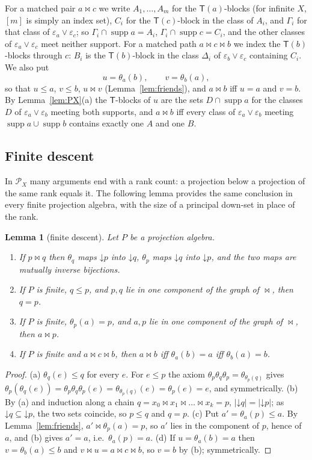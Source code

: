 \documentclass[11pt]{amsart}
\newtheorem{lemma}[theorem]{Lemma}
\theoremstyle{definition}
\renewcommand{\P}{\mathcal{P}}      %
\newcommand{\supp}{\operatorname{supp}}
\newcommand{\T}{\mathsf{T}}
\newcommand{\mt}{\bowtie}      %
\newcommand{\dn}{\mathord\downarrow}
\begin{document}
For a matched pair $a\mt c$ we write $A_1,\dots,A_m$ for the $\T(a)$-blocks (for infinite $X$, $[m]$ is simply an index set), $C_i$ for the $\T(c)$-block in the class of $A_i$, and $\Gamma_i$ for that class of $\varepsilon_a\vee\varepsilon_c$; so $\Gamma_i\cap\supp a=A_i$, $\Gamma_i\cap\supp c=C_i$, and the other classes of $\varepsilon_a\vee\varepsilon_c$ meet neither support. For a matched path $a\mt c\mt b$ we index the $\T(b)$-blocks through $c$: $B_i$ is the $\T(b)$-block in the class $\Delta_i$ of $\varepsilon_b\vee\varepsilon_c$ containing $C_i$. We also put
\[
u=\theta_a(b),\qquad v=\theta_b(a),
\]
so that $u\le a$, $v\le b$, $u\mt v$ (Lemma~\ref{lem:friends}), and $a\mt b$ iff $u=a$ and $v=b$. By Lemma~\ref{lem:PX}(a) the $\T$-blocks of $u$ are the sets $D\cap\supp a$ for the classes $D$ of $\varepsilon_a\vee\varepsilon_b$ meeting both supports, and $a\mt b$ iff every class of $\varepsilon_a\vee\varepsilon_b$ meeting $\supp a\cup\supp b$ contains exactly one $A$ and one $B$.

\subsection{Finite descent}\label{subsec:descent}

In $\P_X$ many arguments end with a rank count: a projection below a projection of the same rank equals it. The following lemma provides the same conclusion in every finite projection algebra, with the size of a principal down-set in place of the rank.

\begin{lemma}[finite descent]\label{lem:descent}
Let $P$ be a projection algebra.
\begin{enumerate}[label=\textup{(\alph*)}]
\item If $p\mt q$ then $\theta_q$ maps $\dn p$ into $\dn q$, $\theta_p$ maps $\dn q$ into $\dn p$, and the two maps are mutually inverse bijections.
\item If $P$ is finite, $q\le p$, and $p,q$ lie in one component of the graph of $\mt$, then $q=p$.
\item If $P$ is finite, $\theta_p(a)=p$, and $a,p$ lie in one component of the graph of $\mt$, then $a\mt p$.
\item If $P$ is finite and $a\mt c\mt b$, then $a\mt b$ iff $\theta_a(b)=a$ iff $\theta_b(a)=b$.
\end{enumerate}
\end{lemma}

\begin{proof}
(a) $\theta_q(e)\le q$ for every $e$. For $e\le p$ the axiom $\theta_p\theta_q\theta_p=\theta_{\theta_p(q)}$ gives $\theta_p(\theta_q(e))=\theta_p\theta_q\theta_p(e)=\theta_{\theta_p(q)}(e)=\theta_p(e)=e$, and symmetrically. (b) By (a) and induction along a chain $q=x_0\mt x_1\mt\dots\mt x_k=p$, $|\dn q|=|\dn p|$; as $\dn q\subseteq\dn p$, the two sets coincide, so $p\le q$ and $q=p$. (c) Put $a'=\theta_a(p)\le a$. By Lemma~\ref{lem:friends}, $a'\mt\theta_p(a)=p$, so $a'$ lies in the component of $p$, hence of $a$, and (b) gives $a'=a$, i.e.\ $\theta_a(p)=a$. (d) If $u=\theta_a(b)=a$ then $v=\theta_b(a)\le b$ and $v\mt u=a\mt c\mt b$, so $v=b$ by (b); symmetrically.
\end{proof}
\end{document}
